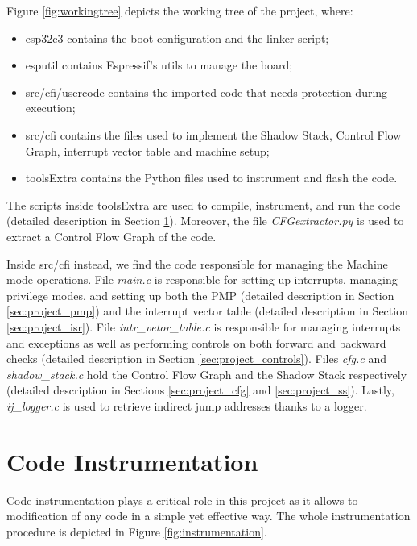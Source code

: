 Figure \ref{fig:workingtree} depicts the working tree of the project, where:
\begin{itemize}
  \item esp32c3 contains the boot configuration and the linker script;

  \item esputil contains Espressif's utils to manage the board;

  \item src/cfi/usercode contains the imported code that needs protection during
    execution;

  \item src/cfi contains the files used to implement the Shadow Stack, Control
    Flow Graph, interrupt vector table and machine setup;

  \item toolsExtra contains the Python files used to instrument and flash the code.
\end{itemize}

The scripts inside toolsExtra are used to compile, instrument, and run the code
(detailed description in Section \ref{sec:project_instrumentation}). Moreover,
the file \textit{CFGextractor.py} is used to extract a Control Flow Graph of the
code.

Inside src/cfi instead, we find the code responsible for managing the Machine
mode operations. File \textit{main.c} is responsible for setting up interrupts, managing
privilege modes, and setting up both the PMP (detailed description in Section \ref{sec:project_pmp})
and the interrupt vector table (detailed description in Section \ref{sec:project_isr}).
File \textit{intr\_vetor\_table.c} is responsible for managing interrupts and
exceptions as well as performing controls on both forward and backward checks (detailed
description in Section \ref{sec:project_controls}). Files \textit{cfg.c} and
\textit{shadow\_stack.c} hold the Control Flow Graph and the Shadow Stack respectively
(detailed description in Sections \ref{sec:project_cfg} and \ref{sec:project_ss}).
Lastly, \textit{ij\_logger.c} is used to retrieve indirect jump addresses thanks
to a logger.

\section{Code Instrumentation}
\label{sec:project_instrumentation}

Code instrumentation plays a critical role in this project as it allows to modification
of any code in a simple yet effective way. The whole instrumentation procedure
is depicted in Figure \ref{fig:instrumentation}.

